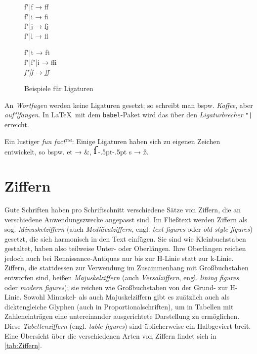 \begin{figure}
  \centering

  \begin{minipage}{.2\textwidth}
    \centering\huge
    f"|f → ff\\
    f"|i → fi\\
    f"|j → fj\\
    f"|l → fl
  \end{minipage}
  \hspace{.1\textwidth}
  \begin{minipage}{.2\textwidth}
    \centering\huge
    f"|t → ft\\
    f"|f"|i → ffi\\
    \emph{f"|f} → \emph{ff}
  \end{minipage}

  \caption{Beispiele für Ligaturen}
  \label{fig:Ligatur}
\end{figure}

An \emph{Wortfugen} werden keine Ligaturen gesetzt; so schreibt man
bspw. \emph{Kaffee}, aber \emph{auf"|fangen}.  In \LaTeX\ mit dem
\texttt{babel}-Paket wird das über den \emph{Ligaturbrecher} \verb!"|!
erreicht.

\enlargethispage{\baselineskip}

\newcommand*{\longS}{\includegraphics{long_s}\kern-.5pt}

Ein lustiger \emph{fun fact}™: Einige Ligaturen haben sich zu eigenen
Zeichen entwickelt, so bspw. et → \&,  \longS\kern-.5pt s → ß.

\section{Ziffern}
\label{sec:Ziffern}

Gute Schriften haben pro Schriftschnitt verschiedene Sätze von
Ziffern, die an verschiedene Anwendungszwecke angepasst sind.  Im
Fließtext werden Ziffern als sog. \emph{Minuskelziffern} (auch
\emph{Mediävalziffern}, engl. \emph{\foreignlanguage{british}{text
    figures}} oder \emph{\foreignlanguage{british}{old style
    figures}}) gesetzt, die sich harmonisch in den Text einfügen.  Sie
sind wie Kleinbuchstaben gestaltet, haben also teilweise Unter- oder
Oberlängen.  Ihre Oberlängen reichen jedoch auch bei
Renaissance-Antiquas nur bis zur H-Linie statt zur k-Linie.  Ziffern,
die stattdessen zur Verwendung im Zusammenhang mit Großbuchstaben
entworfen sind, heißen \emph{Majuskelziffern} (auch
\emph{Versalziffern}, engl. \emph{\foreignlanguage{british}{lining
    figures}} oder \emph{\foreignlanguage{british}{modern figures}});
sie reichen wie Großbuchstaben von der Grund- zur H-Linie.  Sowohl
Minuskel- als auch Majuskelziffern gibt es zuätzlich auch als
dicktengleiche Glyphen (auch in Proportionalschriften), um in Tabellen
mit Zahleneinträgen eine untereinander ausgerichtete Darstellung zu
ermöglichen.  Diese \emph{Tabellenziffern}
(engl. \emph{\foreignlanguage{british}{table figures}}) sind
üblicherweise ein Halbgeviert breit.  Eine Übersicht über die
verschiedenen Arten von Ziffern findet sich in \cref{tab:Ziffern}.

